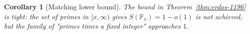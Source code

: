 \documentclass{article}
\newtheorem{corollary}[theorem]{Corollary}
\theoremstyle{definition}
\begin{document}
\begin{corollary}[Matching lower bound]
\label{cor:lower-bound}
The bound in Theorem~\ref{thm:erdos-1196} is tight: the set of primes
in $[x, \infty)$ gives $S(\mathbb{P}_x) = 1 - o(1)$ is \emph{not} achieved,
but the family of "primes times a fixed integer" approaches $1$.
\end{corollary}
\end{document}
